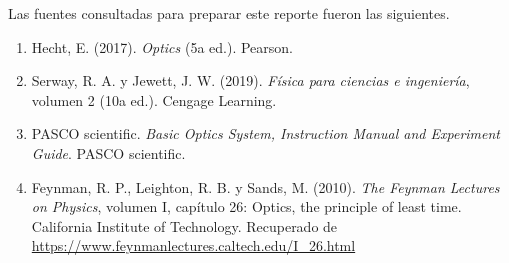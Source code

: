 Las fuentes consultadas para preparar este reporte fueron las siguientes.

\begin{enumerate}
\item Hecht, E. (2017). \textit{Optics} (5a ed.). Pearson.
\item Serway, R. A. y Jewett, J. W. (2019). \textit{Física para ciencias e ingeniería}, volumen 2 (10a ed.). Cengage Learning.
\item PASCO scientific. \textit{Basic Optics System, Instruction Manual and Experiment Guide}. PASCO scientific.
\item Feynman, R. P., Leighton, R. B. y Sands, M. (2010). \textit{The Feynman Lectures on Physics}, volumen I, capítulo 26: Optics, the principle of least time. California Institute of Technology. Recuperado de \url{https://www.feynmanlectures.caltech.edu/I_26.html}
\end{enumerate}
